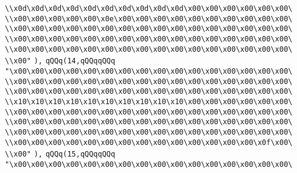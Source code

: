 \verb|\\x0d\x0d\x0d\x0d\x0d\x0d\x0d\x0d\x0d\x0d\x00\x00\x00\x00\x00\x00\|\newline
\verb|\\x00\x00\x00\x00\x00\x0e\x00\x00\x00\x00\x00\x00\x00\x00\x00\x00\|\newline
\verb|\\x00\x00\x00\x00\x00\x00\x00\x00\x00\x00\x00\x00\x00\x00\x00\x00\|\newline
\verb|\\x00\x00\x00\x00\x00\x00\x00\x00\x00\x00\x00\x00\x00\x00\x00\x00\|\newline
\verb|\\x00\x00\x00\x00\x00\x00\x00\x00\x00\x00\x00\x00\x00\x00\x00\x00\|\newline
\verb|\\x00"|\newline
\verb|),|\newline
\verb|qQQq(14,qQQqqQQq|\newline
\verb|"\x00\x00\x00\x00\x00\x00\x00\x00\x00\x00\x00\x00\x00\x00\x00\x00\|\newline
\verb|\\x00\x00\x00\x00\x00\x00\x00\x00\x00\x00\x00\x00\x00\x00\x00\x00\|\newline
\verb|\\x00\x00\x00\x00\x00\x00\x00\x00\x00\x00\x00\x00\x00\x00\x00\x00\|\newline
\verb|\\x10\x10\x10\x10\x10\x10\x10\x10\x10\x10\x00\x00\x00\x00\x00\x00\|\newline
\verb|\\x00\x00\x00\x00\x00\x00\x00\x00\x00\x00\x00\x00\x00\x00\x00\x00\|\newline
\verb|\\x00\x00\x00\x00\x00\x00\x00\x00\x00\x00\x00\x00\x00\x00\x00\x00\|\newline
\verb|\\x00\x00\x00\x00\x00\x00\x00\x00\x00\x00\x00\x00\x00\x00\x00\x00\|\newline
\verb|\\x00\x00\x00\x00\x00\x00\x00\x00\x00\x00\x00\x00\x00\x00\x0f\x00\|\newline
\verb|\\x00"|\newline
\verb|),|\newline
\verb|qQQq(15,qQQqqQQq|\newline
\verb|"\x00\x00\x00\x00\x00\x00\x00\x00\x00\x00\x00\x00\x00\x00\x00\x00\|\newline
